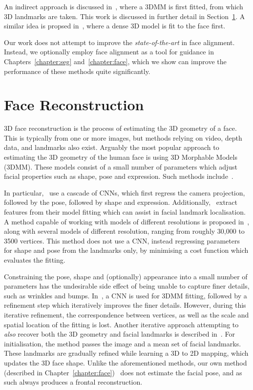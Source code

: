 An indirect approach is discussed in~\cite{zhu2016face}, where a 3DMM
is first fitted, from which 3D landmarks are taken. This work is
discussed in further detail in
Section~\ref{chap:literature:sec:face_recon}. A similar idea is
propsed in~\cite{jourabloo2016large}, where a dense 3D model is fit to
the face first.

Our work does not attempt to improve the \textit{state-of-the-art} in
face alignment. Instead, we optionally employ face alignment as a tool
for guidance in Chapters~\ref{chapter:seg} and~\ref{chapter:face},
which we show can improve the performance of these methods quite
significantly.


\section{Face Reconstruction}
\label{chap:literature:sec:face_recon}

3D face reconstruction is the process of estimating the 3D geometry of
a face. This is typically from one or more images, but methods relying
on video, depth data, and landmarks also exist. Arguably the most
popular approach to estimating the 3D geometry of the human face is
using 3D Morphable Models (3DMM). These models consist of a small
number of parameters which adjust facial properties such as shape,
pose and expression. Such methods
include~\cite{jourabloo2016large,huber2016multiresolution,zhu2016face,liu2016joint,tran2018extreme,jiang20183d,jiang2018pose}.

In particular,~\cite{jourabloo2016large} use a cascade of CNNs, which
first regress the camera projection, followed by the pose, followed by
shape and expression. Additionally,~\cite{jourabloo2016large} extract
features from their model fitting which can assist in facial landmark
localisation. A method capable of working with models of different
resolutions is proposed in~\cite{huber2016multiresolution}, along with
several models of different resolution, ranging from roughly 30,000 to
3500 vertices. This method does not use a CNN, instead regressing
parameters for shape and pose from the landmarks only, by minimising a
cost function which evaluates the fitting.

Constraining the pose, shape and (optionally) appearance into a small
number of parameters has the undesirable side effect of being unable
to capture finer details, such as wrinkles and
bumps. In~\cite{tran2018extreme}, a CNN is used for 3DMM fitting,
followed by a refinement step which iteratively improves the finer
details. However, during this iterative refinement, the correspondence
between vertices, as well as the scale and spatial location of the
fitting is lost. Another iterative approach attempting to
\textit{also} recover both the 3D geometry and facial landmarks is
described in~\cite{liu2016joint}. For initialisation, the method
passes the image and a mean set of facial landmarks. These landmarks
are gradually refined while learning a 3D to 2D mapping, which updates
the 3D face shape. Unlike the aforementioned methods, our own method
(described in Chapter~\ref{chapter:face})~\cite{liu2016joint} does not
estimate the facial pose, and as such always produces a frontal
reconstruction.

